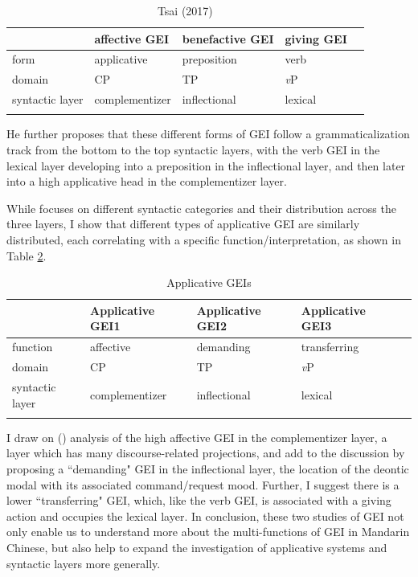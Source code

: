 \documentclass[output=paper,colorlinks,citecolor=brown]{langscibook}
\begin{document}
\begin{table}
\caption{Tsai (2017)}
\label{kuotab:2:different}
 \begin{tabular}{lllll} 
  \lsptoprule
            & affective GEI & benefactive GEI & giving GEI\\ 
  \midrule
  form  &   applicative &    preposition  &   verb\\
  domain & CP & TP & \textit{v}P\\
  syntactic layer  & complementizer & inflectional & lexical\\
  \lspbottomrule
 \end{tabular}
\end{table}

He further proposes that these different forms of GEI follow a grammaticalization track from the bottom to the top syntactic layers, with the verb GEI in the lexical layer developing into a preposition in the inflectional layer, and then later into a high applicative head in the complementizer layer. \par 
While \citet{Tsai2017} focuses on different syntactic categories and their distribution across the three layers, I show that different types of applicative GEI are similarly distributed, each correlating with a specific function/interpretation, as shown in Table \ref{kuotab:3:different2}.

\begin{table}
\caption{Applicative GEIs}
\label{kuotab:3:different2}
 \begin{tabular}{lllll} 
  \lsptoprule
            & Applicative GEI1 & Applicative GEI2 & Applicative GEI3\\ 
  \midrule
  function & affective & demanding & transferring\\
  domain & CP & TP & \textit{v}P\\
  syntactic layer  & complementizer & inflectional & lexical\\
  \lspbottomrule
 \end{tabular}
\end{table}

I draw on  (\citeyear{Tsai2017}) analysis of the high affective GEI in the complementizer layer, a layer which has many discourse-related projections, and add to the discussion by proposing a “demanding" GEI in the inflectional layer, the location of the deontic modal with its associated command/request mood. Further, I suggest there is a lower “transferring" GEI, which, like the verb GEI, is associated with a giving action and occupies the lexical layer. In conclusion, these two studies of GEI not only enable us to understand more about the multi-functions of GEI in Mandarin Chinese, but also help to expand the investigation of applicative systems and syntactic layers more generally.
\end{document}
